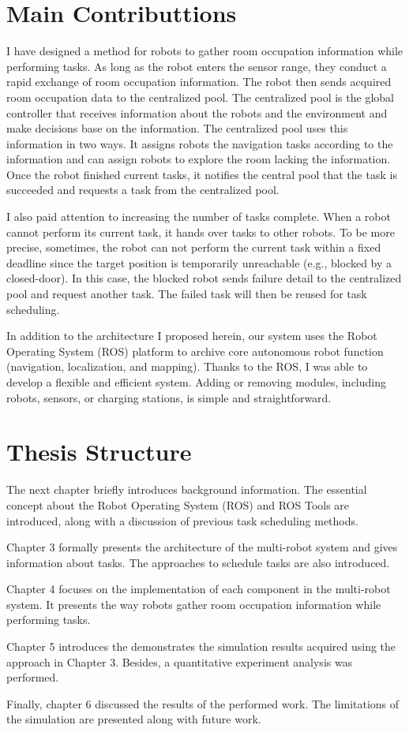 \section{Main Contributtions}

I have designed a method for robots to gather room occupation information while performing tasks.  As long as the robot enters the sensor range, they conduct a rapid exchange of room occupation information. The robot then sends acquired room occupation data to the centralized pool. The centralized pool is the global controller that receives information about the robots and the environment and make decisions base on the information. The centralized pool uses this information in two ways. It assigns robots the navigation tasks according to the information and can assign robots to explore the room lacking the information. Once the robot finished current tasks, it notifies the central pool that the task is succeeded and requests a task from the centralized pool.

I also paid attention to increasing the number of tasks complete.  When a robot cannot perform its current task, it hands over tasks to other robots. To be more precise, sometimes, the robot can not perform the current task within a fixed deadline since the target position is temporarily unreachable (e.g., blocked by a closed-door). In this case, the blocked robot sends failure detail to the centralized pool and request another task. The failed task will then be reused for task scheduling. 


In addition to the architecture I proposed herein, our system uses the Robot Operating System (ROS) platform to archive core autonomous robot function (navigation, localization, and mapping). Thanks to the ROS, I was able to develop a flexible and efficient system. Adding or removing modules, including robots, sensors, or charging stations, is simple and straightforward.

\section{Thesis Structure}

The next chapter briefly introduces background information. The essential concept about the Robot Operating System (ROS) and ROS Tools are introduced, along with a discussion of previous task scheduling methods.

Chapter 3  formally presents the architecture of the multi-robot system and gives information about tasks. The approaches to schedule tasks are also introduced.

Chapter 4 focuses on the implementation of each component in the multi-robot system. It presents the way robots gather room occupation information while performing tasks. 

Chapter 5 introduces the demonstrates the simulation results acquired using the approach in Chapter 3. Besides, a quantitative experiment analysis was performed.

Finally, chapter 6  discussed the results of the performed work. The limitations of the simulation are presented along with future work.



